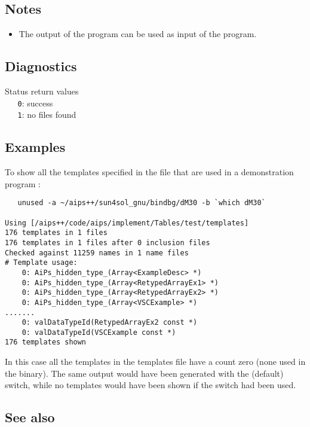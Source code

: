 \subsection*{Notes}

\begin{itemize}
\item
   The output of the program can be used as input of the 
   program. 
\end{itemize}

\subsection*{Diagnostics}

Status return values
\\ \verb+   0+: success
\\ \verb+   1+: no files found

\subsection*{Examples}

To show all the templates specified in the  file
that are used in a demonstration program :

\begin{verbatim}
   unused -a ~/aips++/sun4sol_gnu/bindbg/dM30 -b `which dM30`

Using [/aips++/code/aips/implement/Tables/test/templates]
176 templates in 1 files
176 templates in 1 files after 0 inclusion files
Checked against 11259 names in 1 name files
# Template usage: 
    0: AiPs_hidden_type_(Array<ExampleDesc> *)
    0: AiPs_hidden_type_(Array<RetypedArrayEx1> *)
    0: AiPs_hidden_type_(Array<RetypedArrayEx2> *)
    0: AiPs_hidden_type_(Array<VSCExample> *)
.......
    0: valDataTypeId(RetypedArrayEx2 const *)
    0: valDataTypeId(VSCExample const *)
176 templates shown
\end{verbatim}

In this case all the templates in the templates file have a count zero (none
used in the binary). The same output would have been generated with the
(default)  switch, while no templates would have been shown if the
 switch had been used.


\subsection*{See also}

